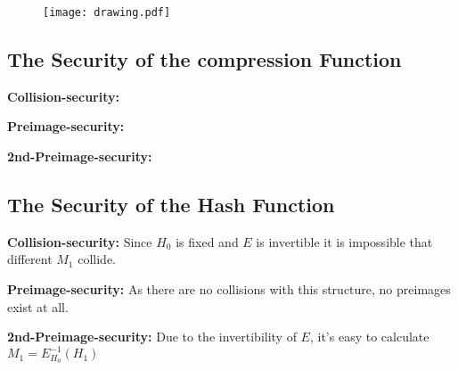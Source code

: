\begin{figure}[H]
    \centering
    \texttt{[image: drawing.pdf]}
\end{figure}

\subsection{The Security of the compression Function}

\begin{description}
    \item \textbf{Collision-security:}
    \item \textbf{Preimage-security:}
    \item \textbf{2nd-Preimage-security:}
\end{description}

\subsection{The Security of the Hash Function}

\begin{description}
    \item \textbf{Collision-security:} Since $H_0$ is fixed and $E$ is invertible it is impossible that different $M_1$ collide.
    \item \textbf{Preimage-security:} As there are no collisions with this structure, no preimages exist at all.
    \item \textbf{2nd-Preimage-security:} Due to the invertibility of $E$, it's easy to calculate $M_1 = E_{H_0}^{-1}(H_1)$
\end{description}


